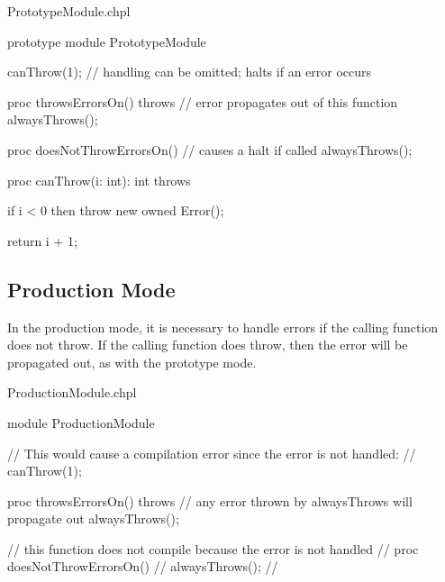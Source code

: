 \begin{chapelexample}{PrototypeModule.chpl}
\begin{chapel}
prototype module PrototypeModule {

  canThrow(1); // handling can be omitted; halts if an error occurs

  proc throwsErrorsOn() throws {
    // error propagates out of this function
    alwaysThrows();
  }

  proc doesNotThrowErrorsOn() {
    // causes a halt if called
    alwaysThrows();
  }

  proc canThrow(i: int): int throws {
    if i < 0 then
      throw new owned Error();

    return i + 1;
  }
}
\end{chapel}
\begin{chapelpost}
\end{chapelpost}
\begin{chapeloutput}
\end{chapeloutput}
\end{chapelexample}

\subsection{Production Mode}
\label{Production_Mode_for_Explicit_Modules}

In the production mode, it is necessary to handle errors if the
calling function does not throw. If the calling function does
throw, then the error will be propagated out, as with the prototype mode.

\begin{chapelexample}{ProductionModule.chpl}
\begin{chapel}
module ProductionModule {
  // This would cause a compilation error since the error is not handled:
  // canThrow(1);

  proc throwsErrorsOn() throws {
    // any error thrown by alwaysThrows will propagate out
    alwaysThrows();
  }

  // this function does not compile because the error is not handled
  // proc doesNotThrowErrorsOn() {
  //   alwaysThrows();
  // }
}
\end{chapel}
\begin{chapelpost}
\end{chapelpost}
\begin{chapeloutput}
\end{chapeloutput}
\end{chapelexample}
